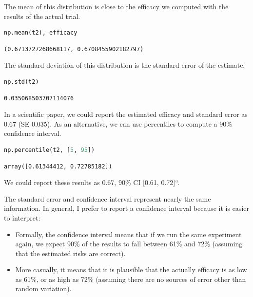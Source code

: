 The mean of this distribution is close to the efficacy we computed with
the results of the actual trial.

\begin{lstlisting}[language=Python,style=source]
np.mean(t2), efficacy
\end{lstlisting}

\begin{lstlisting}[style=output]
(0.6713727268668117, 0.6708455902182797)
\end{lstlisting}

The standard deviation of this distribution is the standard error of the
estimate.

\begin{lstlisting}[language=Python,style=source]
np.std(t2)
\end{lstlisting}

\begin{lstlisting}[style=output]
0.035068503707114076
\end{lstlisting}

In a scientific paper, we could report the estimated efficacy and
standard error as 0.67 (SE 0.035). As an alternative, we can use
percentiles to compute a 90\% confidence interval.

\begin{lstlisting}[language=Python,style=source]
np.percentile(t2, [5, 95])
\end{lstlisting}

\begin{lstlisting}[style=output]
array([0.61344412, 0.72785182])
\end{lstlisting}

We could report these results as 0.67, 90\% CI {[}0.61, 0.72{]}``.

The standard error and confidence interval represent nearly the same
information. In general, I prefer to report a confidence interval
because it is easier to interpret:

\begin{itemize}
\item
  Formally, the confidence interval means that if we run the same
  experiment again, we expect 90\% of the results to fall between 61\%
  and 72\% (assuming that the estimated risks are correct).
\item
  More casually, it means that it is plausible that the actually
  efficacy is as low as 61\%, or as high as 72\% (assuming there are no
  sources of error other than random variation).
\end{itemize}

